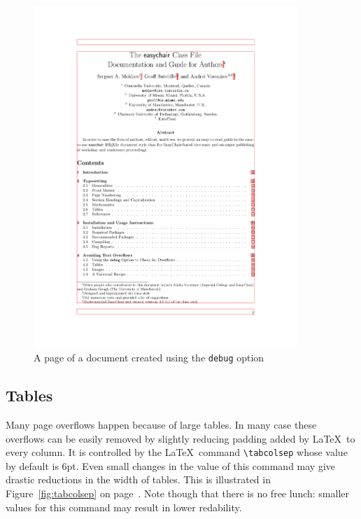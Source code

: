 \documentclass[EPiC]{easychair}
\begin{document}
\begin{figure}
  \begin{centering}
    \includegraphics[width=0.89\textwidth]{debug.pdf}
    \caption{A page of a document created using the \texttt{debug}
      option} 
    \label{fig:redframe}
  \end{centering}
\end{figure}

\subsection{Tables}

Many page overflows happen because of large tables. In many case these
overflows can be easily removed by slightly reducing padding added by
\LaTeX\ to every column. It is controlled by the \LaTeX\ command
\verb|\tabcolsep| whose value by default is 6pt. Even small changes in
the value of this command may give drastic reductions in the width of
tables. This is illustrated in Figure~\ref{fig:tabcolsep} on
page~\pageref{fig:tabcolsep}. Note though that there is no free lunch:
smaller values for this command may result in lower redability.
\end{document}
